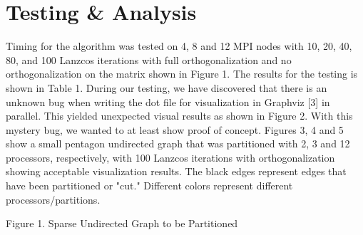 \documentclass[11pt, oneside]{article}   	%
\begin{document}
\section{Testing \& Analysis}

Timing for the algorithm was tested on 4, 8 and 12 MPI nodes with 10, 20, 40, 80, and 100 Lanzcos iterations with full orthogonalization and no orthogonalization on the matrix shown in Figure 1. The results for the testing is shown in Table 1. During our testing, we have discovered that there is an unknown bug when writing the dot file for visualization in Graphviz [3] in parallel. This yielded unexpected visual results as shown in Figure 2. With this mystery bug, we wanted to at least show proof of concept. Figures 3, 4 and 5 show a small pentagon undirected graph that was partitioned with 2, 3 and 12 processors, respectively, with 100 Lanzcos iterations with orthogonalization showing acceptable visualization results. The black edges represent edges that have been partitioned or "cut." Different colors represent different processors/partitions.

\vspace{2mm}

\centerline {}
\centerline{Figure 1. Sparse Undirected Graph to be Partitioned}

\vspace{2mm}
\end{document}
